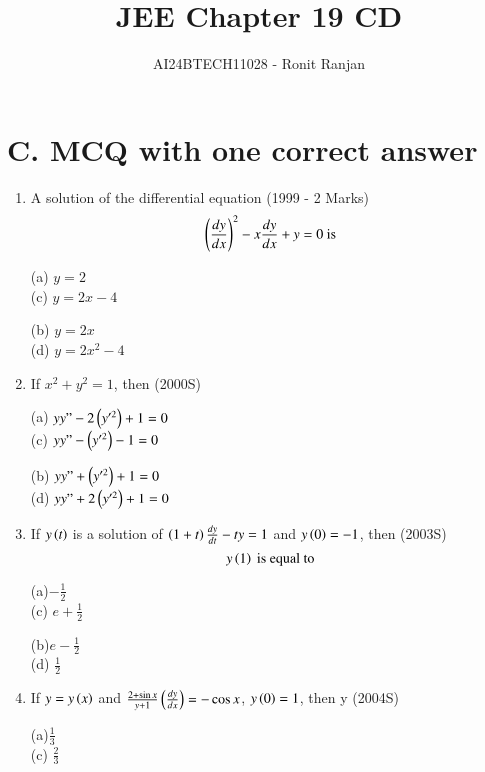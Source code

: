 \documentclass[journal,12pt,twocolumn]{IEEEtran}
\theoremstyle{remark}
\begin{document}

\vspace{3cm}

\title{JEE Chapter 19 CD}
\author{AI24BTECH11028 - Ronit Ranjan}
\maketitle
\newpage
\bigskip
\section*{C. MCQ with one correct answer}
\begin{enumerate}
\item A solution of the differential equation \hfill (1999 - 2 Marks)
\[
\left(\frac{dy}{dx}\right)^2 - x \frac{dy}{dx} + y = 0 \text{ is}
\]
\begin{multicols}{2}
(a) $y = 2$ \\ (c) $y = 2x -4$
\columnbreak

(b) $y = 2x$ \\(d) $y = 2x^{2}-4$
\end{multicols}

\item If $x^2 + y^2 = 1$, then \hfill (2000S)
\begin{multicols}{2}
(a) $yy"-2\left(y'^{2}\right)+1 = 0$ \\ (c) $yy"-\left(y'^{2}\right)-1 = 0$
\columnbreak

(b) $yy"+\left(y'^{2}\right)+1 = 0$ \\(d) $yy"+2\left(y'^{2}\right)+1 = 0$
\end{multicols}

\item If $y\left(t\right)$ is a solution of $\left(1 + t\right) \frac{dy}{dt} - ty = 1$ and $y\left(0\right) = -1$, then \hfill (2003S)
\[
y\left(1\right) \text{ is equal to}
\]
\begin{multicols}{2}
(a)$-\frac{1}{2}$  \\ (c) $e + \frac{1}{2}$
\columnbreak

(b)$e - \frac{1}{2}$  \\(d) $\frac{1}{2}$
\end{multicols}

\item If $y = y\left(x\right)$ and $\frac{2 + \sin x}{y + 1}\left(\frac{dy}{dx}\right) = -\cos x$, $y\left(0\right) = 1$, then y \hfill (2004S)

\begin{multicols}{2}
(a)$\frac{1}{3}$ \\ (c) $\frac{2}{3}$
\columnbreak


\end{multicols}
\end{enumerate}
\end{document}
